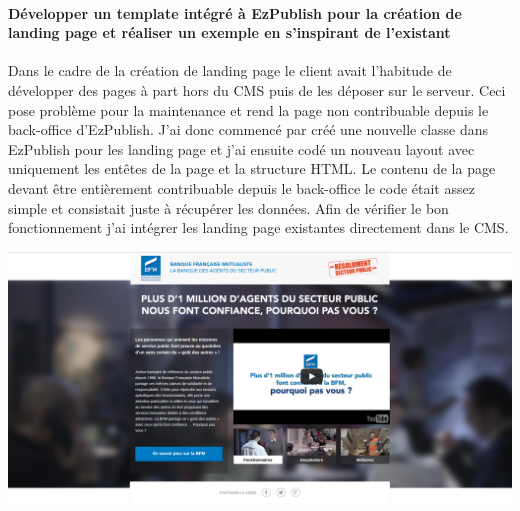 \documentclass[a4paper,11pt,twoside]{report}
\begin{document}
      \paragraph*{Développer un template intégré à EzPublish pour la création de landing page et réaliser un exemple en s'inspirant de l'existant}
      Dans le cadre de la création de landing page le client avait l'habitude de développer des pages à part hors du CMS puis de les déposer sur le serveur. Ceci pose problème pour la maintenance et rend la page non contribuable depuis le back-office d'EzPublish. J'ai donc commencé par créé une nouvelle classe dans EzPublish pour les landing page et j'ai ensuite codé un nouveau layout avec uniquement les entêtes de la page et la structure HTML. Le contenu de la page devant être entièrement contribuable depuis le back-office le code était assez simple et consistait juste à récupérer les données. Afin de vérifier le bon fonctionnement j'ai intégrer les landing page existantes directement dans le CMS.
      \begin{center}
	\includegraphics[width=\textwidth]{images/landing_page1.png} 
	\label{landing_page}
      \end{center}
\end{document}

